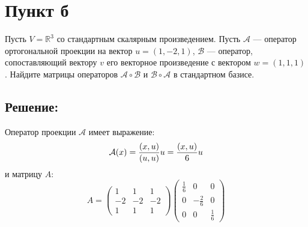 \documentclass[12pt]{article}
\begin{document}
    \section*{Пункт б}
    Пусть $V = \mathbb{R}^3$ со стандартным скалярным произведением. Пусть $\mathcal{A}$ --- оператор ортогональной проекции на вектор $u = (1, -2, 1)$, $\mathcal{B}$ --- оператор,
    сопоставляющий вектору $v$ его векторное произведение с вектором $w = (1, 1, 1)$. Найдите матрицы операторов $\mathcal{A} \circ \mathcal{B}$ и $\mathcal{B} \circ \mathcal{A}$
    в стандартном базисе.

    \subsection*{Решение:}
    Оператор проекции $\mathcal{A}$ имеет выражение:
    \[
        \mathcal{A}(x)
        = \frac{\left ( x, u \right )}{\left ( u, u \right )} u
        = \frac{\left ( x, u \right )}{6} u
    \]
    и матрицу $A$:
    \[
        A
        =
        \begin{pmatrix}
            1  & 1  & 1  \\
            -2 & -2 & -2 \\
            1  & 1  & 1
        \end{pmatrix}
        \begin{pmatrix}
            \frac{1}{6} & 0             & 0           \\
            0           & - \frac{2}{6} & 0           \\
            0           & 0             & \frac{1}{6}
        \end{pmatrix}
    \]
\end{document}

